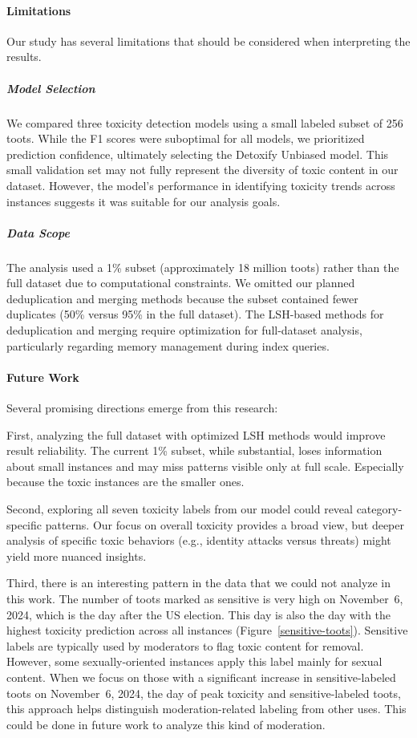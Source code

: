 \paragraph{Limitations}
Our study has several limitations that should be considered when interpreting the results.

\subparagraph{Model Selection}
We compared three toxicity detection models using a small labeled subset of 256 toots. While the F1 scores were suboptimal for all models, we prioritized prediction confidence, ultimately selecting the Detoxify Unbiased model. This small validation set may not fully represent the diversity of toxic content in our dataset. However, the model's performance in identifying toxicity trends across instances suggests it was suitable for our analysis goals.

\subparagraph{Data Scope}
The analysis used a 1\% subset (approximately 18 million toots) rather than the full dataset due to computational constraints. We omitted our planned deduplication and merging methods because the subset contained fewer duplicates (50\% versus 95\% in the full dataset). The LSH-based methods for deduplication and merging require optimization for full-dataset analysis, particularly regarding memory management during index queries.

\paragraph{Future Work}
Several promising directions emerge from this research:

First, analyzing the full dataset with optimized LSH methods would improve result reliability. The current 1\% subset, while substantial, loses information about small instances and may miss patterns visible only at full scale. Especially because the toxic instances are the smaller ones.

Second, exploring all seven toxicity labels from our model could reveal category-specific patterns. Our focus on overall toxicity provides a broad view, but deeper analysis of specific toxic behaviors (e.g., identity attacks versus threats) might yield more nuanced insights.

Third, there is an interesting pattern in the data that we could not analyze in this work. The number of toots marked as sensitive is very high on November~6, 2024, which is the day after the US election. This day is also the day with the highest toxicity prediction across all instances (Figure~\ref{sensitive-toots}). Sensitive labels are typically used by moderators to flag toxic content for removal. However, some sexually-oriented instances apply this label mainly for sexual content. When we focus on those with a significant increase in sensitive-labeled toots on November~6, 2024, the day of peak toxicity and sensitive-labeled toots, this approach helps distinguish moderation-related labeling from other uses. This could be done in future work to analyze this kind of moderation.



